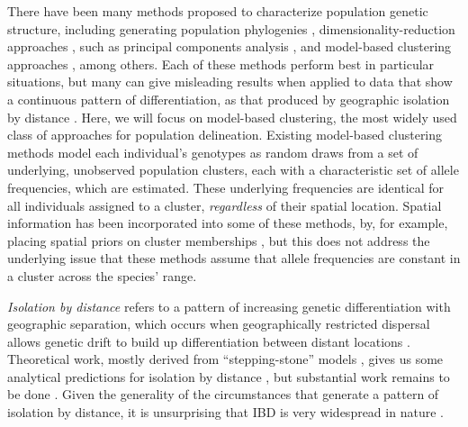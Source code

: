 \documentclass[12pt]{article}
\begin{document}
There have been many methods proposed to characterize population
genetic structure,
including generating population phylogenies \citep{CavalliSforza1975, treemix},
dimensionality-reduction approaches \citep{meirmans2009genodive}, 
such as principal components analysis 
\citep{menozzi1978synthetic,novembre_interpreting_2008, price2006eigenstrat},
and model-based clustering approaches 
\citep[e.g.][]{STRUCTURE, falush2003, hubisz2009,ADMIXTURE, 
FINESTRUCTURE, fastStructure, huelsenbeck2007inference, 
Corander2003,TESS,geneland}, among others.
Each of these methods perform best in particular situations,
but many can give misleading results when applied to data 
that show a continuous pattern of differentiation,
as that produced by geographic isolation by distance 
\citep{Wright1943, novembre_interpreting_2008, Frantz2009}.
Here, we will focus on model-based clustering, the most widely used class of approaches for population delineation.
Existing model-based clustering methods model each individual's genotypes 
as random draws from a set of underlying, unobserved population clusters, 
each with a characteristic set of allele frequencies, which are estimated. 
These underlying frequencies are identical 
for all individuals assigned to a cluster, 
\emph{regardless} of their spatial location. 
Spatial information has been incorporated into some of these methods, 
by, for example, placing spatial priors on cluster memberships \citep{geneland,TESS}, 
but this does not address the underlying issue that 
these methods assume that allele frequencies 
are constant in a cluster across the species' range.  

\emph{Isolation by distance} refers to a pattern of increasing genetic differentiation
with geographic separation,
which occurs when geographically restricted dispersal allows
genetic drift to build up differentiation between distant locations
\citep{Wright1943}. 
Theoretical work,
mostly derived from ``stepping-stone'' models 
\citep{kimura1964stepping,sawyer1976stepping,shiga1984stepping},
gives us some analytical predictions for isolation by distance
\citep{malecot1969mathematics,Slatkin1985,epperson2003geographical}, 
but substantial work remains to be done \citep{barton2002neutral,barton2013modelling}.
Given the generality of the circumstances that generate a pattern of isolation by distance, 
it is unsurprising that IBD is very widespread in nature \citep{meirmans2012,Sexton_etal_2014}.
\end{document}
